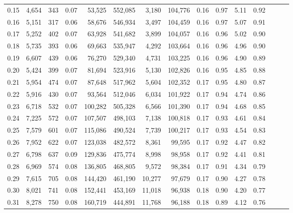 \begin{tabular}{rrrrrrrrrrrrrrr}
0.15 &   4,654 &    343 &  0.07 &   53,525 &  552,085 &    3,180 &  104,776 &  0.16 &  0.97 &  5.11 &      0.92 \\
0.16 &   5,151 &    317 &  0.06 &   58,676 &  546,934 &    3,497 &  104,459 &  0.16 &  0.97 &  5.07 &      0.91 \\
0.17 &   5,252 &    402 &  0.07 &   63,928 &  541,682 &    3,899 &  104,057 &  0.16 &  0.96 &  5.02 &      0.90 \\
0.18 &   5,735 &    393 &  0.06 &   69,663 &  535,947 &    4,292 &  103,664 &  0.16 &  0.96 &  4.96 &      0.90 \\
0.19 &   6,607 &    439 &  0.06 &   76,270 &  529,340 &    4,731 &  103,225 &  0.16 &  0.96 &  4.90 &      0.89 \\
0.20 &   5,424 &    399 &  0.07 &   81,694 &  523,916 &    5,130 &  102,826 &  0.16 &  0.95 &  4.85 &      0.88 \\
0.21 &   5,954 &    474 &  0.07 &   87,648 &  517,962 &    5,604 &  102,352 &  0.17 &  0.95 &  4.80 &      0.87 \\
0.22 &   5,916 &    430 &  0.07 &   93,564 &  512,046 &    6,034 &  101,922 &  0.17 &  0.94 &  4.74 &      0.86 \\
0.23 &   6,718 &    532 &  0.07 &  100,282 &  505,328 &    6,566 &  101,390 &  0.17 &  0.94 &  4.68 &      0.85 \\
0.24 &   7,225 &    572 &  0.07 &  107,507 &  498,103 &    7,138 &  100,818 &  0.17 &  0.93 &  4.61 &      0.84 \\
0.25 &   7,579 &    601 &  0.07 &  115,086 &  490,524 &    7,739 &  100,217 &  0.17 &  0.93 &  4.54 &      0.83 \\
0.26 &   7,952 &    622 &  0.07 &  123,038 &  482,572 &    8,361 &   99,595 &  0.17 &  0.92 &  4.47 &      0.82 \\
0.27 &   6,798 &    637 &  0.09 &  129,836 &  475,774 &    8,998 &   98,958 &  0.17 &  0.92 &  4.41 &      0.81 \\
0.28 &   6,969 &    574 &  0.08 &  136,805 &  468,805 &    9,572 &   98,384 &  0.17 &  0.91 &  4.34 &      0.79 \\
0.29 &   7,615 &    705 &  0.08 &  144,420 &  461,190 &   10,277 &   97,679 &  0.17 &  0.90 &  4.27 &      0.78 \\
0.30 &   8,021 &    741 &  0.08 &  152,441 &  453,169 &   11,018 &   96,938 &  0.18 &  0.90 &  4.20 &      0.77 \\
0.31 &   8,278 &    750 &  0.08 &  160,719 &  444,891 &   11,768 &   96,188 &  0.18 &  0.89 &  4.12 &      0.76 \\

\end{tabular}
